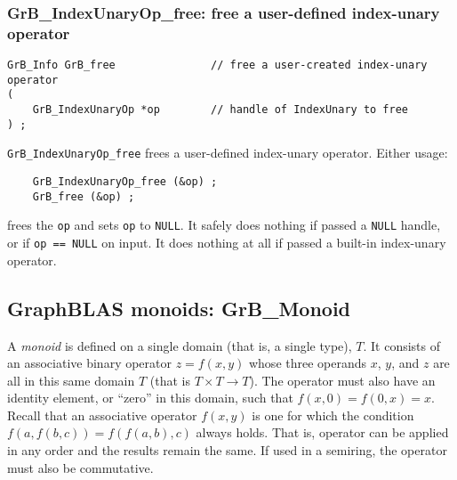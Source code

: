 \documentclass[12pt]{article}
\begin{document}
\subsubsection{{\sf GrB\_IndexUnaryOp\_free:} free a user-defined index-unary operator}
\label{idxunop_free}

\begin{mdframed}[userdefinedwidth=6in]
{\footnotesize
\begin{verbatim}
GrB_Info GrB_free               // free a user-created index-unary operator
(
    GrB_IndexUnaryOp *op        // handle of IndexUnary to free
) ;
\end{verbatim}
}\end{mdframed}

\verb'GrB_IndexUnaryOp_free' frees a user-defined index-unary operator.  Either usage:

    {\small
    \begin{verbatim}
    GrB_IndexUnaryOp_free (&op) ;
    GrB_free (&op) ; \end{verbatim}}

\noindent
frees the \verb'op' and sets \verb'op' to \verb'NULL'.  It safely
does nothing if passed a \verb'NULL' handle, or if \verb'op == NULL' on
input.  It does nothing at all if passed a built-in index-unary operator.


\newpage
\subsection{GraphBLAS monoids: {\sf GrB\_Monoid}} %
\label{monoid}

A {\em monoid} is defined on a single domain (that is, a single type), $T$.  It
consists of an associative binary operator $z=f(x,y)$ whose three operands $x$,
$y$, and $z$ are all in this same domain $T$ (that is $T \times T \rightarrow
T$).  The operator must also have an identity element, or ``zero'' in this
domain, such that $f(x,0)=f(0,x)=x$.  Recall that an associative operator
$f(x,y)$ is one for which the condition $f(a, f(b,c)) = f(f (a,b),c)$ always
holds.  That is, operator can be applied in any order and the results remain
the same.  If used in a semiring, the operator must also be commutative.
\end{document}
